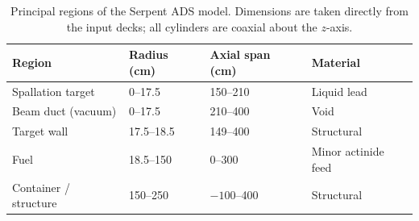 \begin{table}[h!]
    \centering
    \caption{Principal regions of the Serpent \gls{ADS} model. Dimensions are
    taken directly from the input decks; all cylinders are coaxial about the
    \(z\)-axis.}
    \label{tab:serpent-geometry}
    \footnotesize
    \begin{tabular}{p{} p{} p{} p{}}
        \hline
        \textbf{Region} & \textbf{Radius (cm)} & \textbf{Axial span (cm)} &
        \textbf{Material} \\
        \hline
        Spallation target & 0--17.5   & 150--210  & Liquid lead \\
        Beam duct (vacuum) & 0--17.5  & 210--400  & Void \\
        Target wall        & 17.5--18.5 & 149--400 & Structural \\
        Fuel               & 18.5--150 & 0--300    & Minor actinide feed\\
        Container / structure & 150--250 & \(-100\)--400 & Structural \\
        \hline
    \end{tabular}
\end{table}

